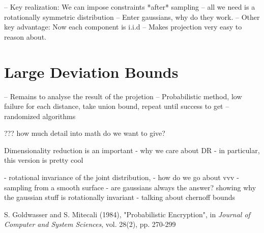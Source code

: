 \documentclass[11pt]{article}
\newcommand{\ir}[1]{\textnormal{\sc#1}}
\begin{document}
-- Key realization: We can impose constraints *after* sampling
   -- all we need is a rotationally symmetric distribution
-- Enter gaussians, why do they work.
-- Other key advantage: Now each component is i.i.d
    -- Makes projection very easy to reason about.

\section{Large Deviation Bounds}
-- Remains to analyse the result of the projetion
-- Probabilistic method, low failure for each distance, take union bound, repeat until success to get
-- randomized algorithms

??? how much detail into math do we want to give?



Dimensionality reduction is an important 
- why we care about DR
- in particular, this version is pretty cool

- rotational invariance of the joint distribution, 
- how do we go about vvv 
- sampling from a smooth surface
- are gaussians always the answer?
showing why the gaussian stuff is rotationally invariant
- talking about chernoff bounds

\begin{thebibliography}{1}
     \ir{S. Goldwasser and S. Mitecali} (1984), "Probabilistic Encryption", in \textit{Journal of Computer and System Sciences}, vol. 28(2), pp. 270-299
        
\end{thebibliography}
\end{document}
